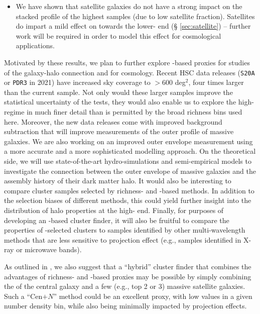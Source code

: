 \documentclass[fleqn,usenatbib,useAMS]{mnras}
\begin{document}
\begin{CJK*}{UTF8}{gbsn}
\begin{itemize}
        \item We have shown that satellite galaxies do not have a strong impact on the stacked
            \dsigma{} profile of the highest \mstar{} samples (due to low satellite fraction).
            Satellites do impart a mild effect on \dsigma{} towards the lower-\mstar{} end (\S
            \ref{sec:satellite}) -- further work will be required in order to model this effect for
            cosmological applications.

    \end{itemize}

    Motivated by these results, we plan to further explore \mstar{}-based \mvir{} proxies for
    studies of the galaxy-halo connection and for cosmology.
    Recent HSC data releases (\texttt{S20A} or \texttt{PDR3} in 2021) have increased sky coverage to
    $> 600$ deg$^2$, four times larger than the current sample.
    Not only would these larger samples improve the statistical uncertainty of the \topn{} tests,
    they would also enable us to explore the high-\mvir{} regime in much finer detail than is
    permitted by the broad richness bins used here.
    Moreover, the new data releases come with improved background subtraction that will improve
    measurements of the outer profile of massive galaxies.
    We are also working on an improved outer envelope \mstar{} measurement using a more accurate
    \mlratio{} and a more sophisticated modelling approach.
    On the theoretical side, we will use state-of-the-art hydro-simulations and semi-empirical
    models to investigate the connection between the outer envelope of massive galaxies and the
    assembly history of their dark matter halo. 
    It would also be interesting to compare cluster samples selected by richness- and \mstar{}-based
    methods.
    In addition to the selection biases of different methods, this could yield further insight into
    the distribution of halo properties at the high-\mvir{} end. 
    Finally, for purposes of developing an \mstar{}-based cluster finder, it will also be fruitful
    to compare the properties of \mstar{}-selected clusters to samples identified by other
    multi-wavelength methods that are less sensitive to projection effect (e.g., samples identified
    in X-ray or microwave bands).

    As outlined in \citet{Bradshaw2020}, we also suggest that a ``hybrid'' cluster finder that
    combines the advantages of richness- and \mstar{}-based \mvir{} proxies may be possible by
    simply combining the \mstar{} of the central galaxy and a few (e.g., top 2 or 3) massive
    satellite galaxies.
    Such a ``Cen$+N$'' method could be an excellent \mvir{} proxy, with low \sigmvir{} values in a
    given number density bin, while also being minimally impacted by projection effects.
    

\end{CJK*}
\end{document}
